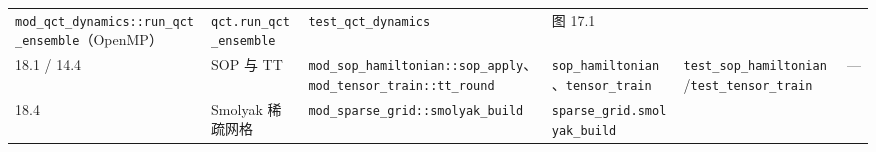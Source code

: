 \documentclass[
]{ctexbook}
\begin{document}
\begin{longtable}[]{@{}llllll@{}}
\begin{minipage}[t]{0.14\columnwidth}
\texttt{mod\_qct\_dynamics::run\_qct\_ensemble}（OpenMP）\strut
\end{minipage} & \begin{minipage}[t]{0.14\columnwidth}\raggedright
\texttt{qct.run\_qct\_ensemble}\strut
\end{minipage} & \begin{minipage}[t]{0.14\columnwidth}\raggedright
\texttt{test\_qct\_dynamics}\strut
\end{minipage} & \begin{minipage}[t]{0.14\columnwidth}\raggedright
图 17.1\strut
\end{minipage}\tabularnewline
\begin{minipage}[t]{0.14\columnwidth}\raggedright
18.1 / 14.4\strut
\end{minipage} & \begin{minipage}[t]{0.14\columnwidth}\raggedright
SOP 与 TT\strut
\end{minipage} & \begin{minipage}[t]{0.14\columnwidth}\raggedright
\texttt{mod\_sop\_hamiltonian::sop\_apply}、\texttt{mod\_tensor\_train::tt\_round}\strut
\end{minipage} & \begin{minipage}[t]{0.14\columnwidth}\raggedright
\texttt{sop\_hamiltonian}、\texttt{tensor\_train}\strut
\end{minipage} & \begin{minipage}[t]{0.14\columnwidth}\raggedright
\texttt{test\_sop\_hamiltonian}/\texttt{test\_tensor\_train}\strut
\end{minipage} & \begin{minipage}[t]{0.14\columnwidth}\raggedright
---\strut
\end{minipage}\tabularnewline
\begin{minipage}[t]{0.14\columnwidth}\raggedright
18.4\strut
\end{minipage} & \begin{minipage}[t]{0.14\columnwidth}\raggedright
Smolyak 稀疏网格\strut
\end{minipage} & \begin{minipage}[t]{0.14\columnwidth}\raggedright
\texttt{mod\_sparse\_grid::smolyak\_build}\strut
\end{minipage} & \begin{minipage}[t]{0.14\columnwidth}\raggedright
\texttt{sparse\_grid.smolyak\_build}\strut
\end{minipage} & \begin{minipage}[t]{0.14\columnwidth}\raggedright

\end{minipage}
\end{longtable}
\end{document}
